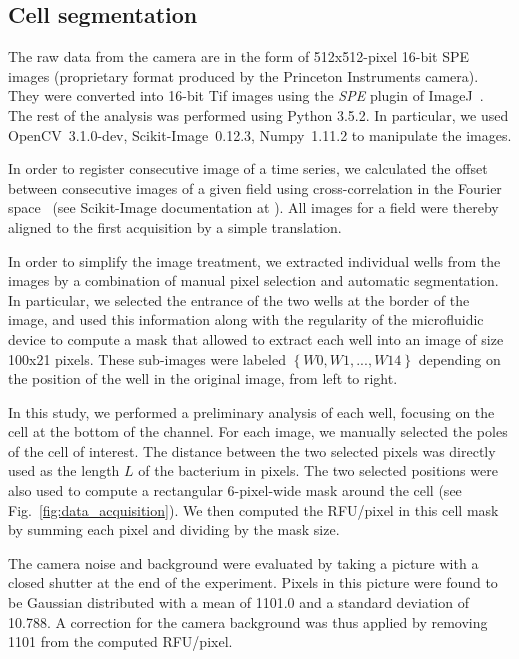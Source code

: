 \subsection{Cell segmentation}

\label{sec:cell_segmentation}

The raw data from the camera are in the form of 512x512-pixel 16-bit
SPE images (proprietary format produced by the Princeton Instruments
camera). They were converted into 16-bit Tif images using the \textit{SPE}
plugin of ImageJ~\cite{goto_open_2005}. The rest of the analysis
was performed using Python 3.5.2. In particular, we used OpenCV~3.1.0-dev,
Scikit-Image~0.12.3, Numpy~1.11.2 to manipulate the images.

In order to register consecutive image of a time series, we calculated
the offset between consecutive images of a given field using cross-correlation
in the Fourier space~\cite{guizar-sicairos_efficient_2008} (see
Scikit-Image documentation at \cite{skimage_cross-correlation}).
All images for a field were thereby aligned to the first acquisition
by a simple translation.

In order to simplify the image treatment, we extracted individual
wells from the images by a combination of manual pixel selection and
automatic segmentation. In particular, we selected the entrance of
the two wells at the border of the image, and used this information
along with the regularity of the microfluidic device to compute a
mask that allowed to extract each well into an image of size 100x21
pixels. These sub-images were labeled $\left\{ W0,W1,...,W14\right\} $
depending on the position of the well in the original image, from
left to right.

In this study, we performed a preliminary analysis of each well, focusing
on the cell at the bottom of the channel. For each image, we manually
selected the poles of the cell of interest. The distance between the
two selected pixels was directly used as the length $L$ of the bacterium
in pixels. The two selected positions were also used to compute a
rectangular 6-pixel-wide mask around the cell (see Fig.~\ref{fig:data_acquisition}).
We then computed the RFU/pixel in this cell mask by summing each pixel
and dividing by the mask size.

The camera noise and background were evaluated by taking a picture
with a closed shutter at the end of the experiment. Pixels in this
picture were found to be Gaussian distributed with a mean of 1101.0
and a standard deviation of 10.788. A correction for the camera background
was thus applied by removing 1101 from the computed RFU/pixel.

